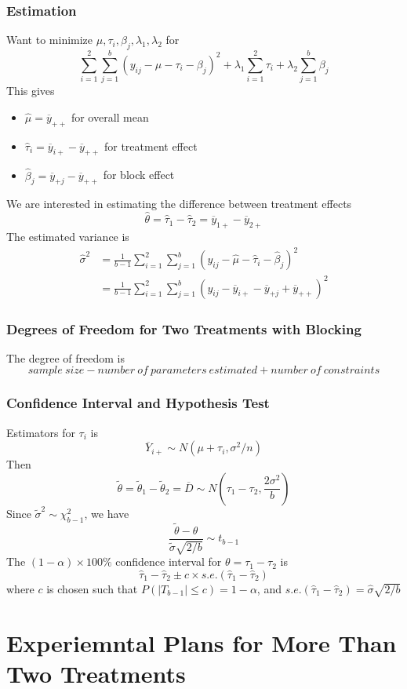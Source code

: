 \documentclass[11pt]{article}
\begin{document}
\subsubsection{Estimation}
Want to minimize $\mu,\tau_i,\beta_j,\lambda_1,\lambda_2$ for 
\[\sum_{i=1}^{2}\sum_{j=1}^{b}(y_{ij}-\mu-\tau_i-\beta_j)^2 + \lambda_1\sum_{i=1}^{2}\tau_i + \lambda_2\sum_{j=1}^{b}\beta_j\]
This gives 
\begin{itemize}
    \item $\hat\mu=\overline{y}_{++}$ for overall mean 
    \item $\hat\tau_i=\overline{y}_{i+}-\overline{y}_{++}$ for treatment effect
    \item $\hat\beta_j=\overline{y}_{+j}-\overline{y}_{++}$ for block effect
\end{itemize}
We are interested in estimating the difference between treatment effects 
\[\hat\theta = \hat\tau_1-\hat\tau_2 = \overline{y}_{1+}-\overline{y}_{2+}\]
The estimated variance is 
\begin{align*}
    \hat\sigma^2 &= \frac{1}{b-1}\sum_{i=1}^{2} \sum_{j=1}^{b}(y_{ij}-\hat\mu-\hat\tau_i-\hat\beta_j)^2 \\
    &= \frac{1}{b-1}\sum_{i=1}^{2}\sum_{j=1}^{b}(y_{ij}-\overline{y}_{i+}-\overline{y}_{+j}+\overline{y}_{++})^2
\end{align*}
\subsubsection{Degrees of Freedom for Two Treatments with Blocking}
The degree of freedom is 
\[sample\ size - number\ of\ parameters\ estimated + number\ of\ constraints\]
\subsubsection{Confidence Interval and Hypothesis Test}
Estimators for $\tau_i$ is 
\[\overline{Y}_{i+}\sim N(\mu+\tau_i, \sigma^2/n)\]
Then 
\[\tilde{\theta}=\tilde{\theta}_1-\tilde{\theta}_2=\overline{D}\sim N(\tau_1-\tau_2, \frac{2\sigma^2}{b})\]
Since $\tilde{\sigma}^2\sim\chi^2_{b-1}$, we have
\[\frac{\tilde{\theta}-\theta}{\tilde{\sigma}\sqrt{2/b}}\sim t_{b-1}\]
The $(1-\alpha)\times 100\%$ confidence interval for $\theta=\tau_1-\tau_2$ is 
\[\hat\tau_1 - \hat\tau_2\pm c\times s.e.(\hat\tau_1-\hat\tau_2)\]
where $c$ is chosen such that $P(|T_{b-1}|\leq c)=1-\alpha$, and $s.e.(\hat\tau_1-\hat\tau_2)=\hat\sigma\sqrt{2/b}$

\section{Experiemntal Plans for More Than Two Treatments}
\end{document}
